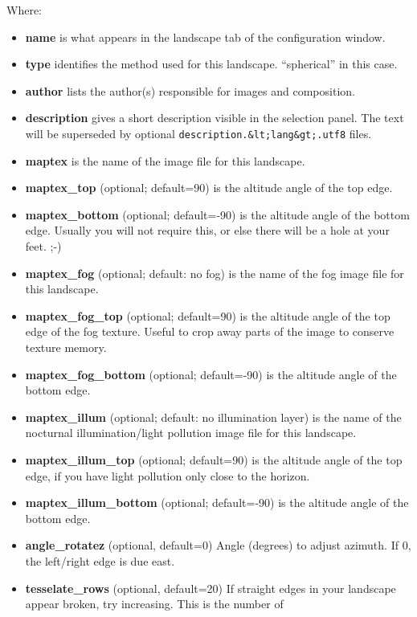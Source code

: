 Where:

\begin{itemize}
\item
  \textbf{name} is what appears in the landscape tab of the
  configuration window.
\item
  \textbf{type} identifies the method used for this landscape.
  ``spherical'' in this case.
\item
  \textbf{author} lists the author(s) responsible for images and
  composition.
\item
  \textbf{description} gives a short description visible in the
  selection panel. The text will be superseded by optional
  \texttt{description.\&lt;lang\&gt;.utf8} files.
\item
  \textbf{maptex} is the name of the image file for this landscape.
\item
  \textbf{maptex\_top} (optional; default=90) is the altitude angle of
  the top edge.
\item
  \textbf{maptex\_bottom} (optional; default=-90) is the altitude angle
  of the bottom edge. Usually you will not require this, or else there
  will be a hole at your feet. ;-)
\item
  \textbf{maptex\_fog} (optional; default: no fog) is the name of the
  fog image file for this landscape.
\item
  \textbf{maptex\_fog\_top} (optional; default=90) is the altitude angle
  of the top edge of the fog texture. Useful to crop away parts of the
  image to conserve texture memory.
\item
  \textbf{maptex\_fog\_bottom} (optional; default=-90) is the altitude
  angle of the bottom edge.
\item
  \textbf{maptex\_illum} (optional; default: no illumination layer) is
  the name of the nocturnal illumination/light pollution image file for
  this landscape.
\item
  \textbf{maptex\_illum\_top} (optional; default=90) is the altitude
  angle of the top edge, if you have light pollution only close to the
  horizon.
\item
  \textbf{maptex\_illum\_bottom} (optional; default=-90) is the altitude
  angle of the bottom edge.
\item
  \textbf{angle\_rotatez} (optional, default=0) Angle (degrees) to
  adjust azimuth. If 0, the left/right edge is due east.
\item
  \textbf{tesselate\_rows} (optional, default=20) If straight edges in
  your landscape appear broken, try increasing. This is the number of

\end{itemize}
